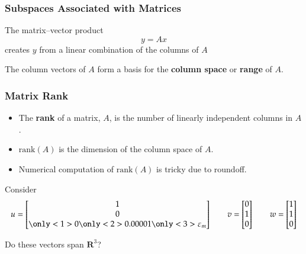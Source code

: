 \documentclass[10pt]{beamer}
\newcommand{\rank}[1]{\ensuremath{\mathrm{rank}(#1)}}
\newcommand{\epsm}{\ensuremath{\varepsilon_m}}
\begin{document}
\begin{frame}
\frametitle{Subspaces Associated with Matrices}

The matrix--vector product
\begin{equation*}
    y = Ax
\end{equation*}
creates $y$ from a linear combination of the columns of $A$

The column vectors of $A$ form a basis for the \textbf{column space}
or \textbf{range} of $A$.

\end{frame}
\begin{frame}
\frametitle{Matrix Rank}

\begin{itemize}
  \item The \textbf{rank} of a matrix, $A$, is the number of linearly independent
columns in $A$.

  \item \rank{A} is the dimension of the column space of $A$.

  \item Numerical computation of \rank{A} is tricky due to roundoff.
\end{itemize}

Consider
\begin{equation*}
    u = \begin{bmatrix} 1 \\ 0 \\ 
    \only<1>{0}
    \only<2>{0.00001}
    \only<3>{\epsm}
    \end{bmatrix}
    \ \ \ \ \ \ \ \
    v = \begin{bmatrix} 0 \\ 1 \\ 0   \end{bmatrix}
    \ \ \ \ \ \ \ \
    w = \begin{bmatrix} 1 \\ 1 \\ 0 \end{bmatrix}
\end{equation*}

\vspace{1ex}
Do these vectors span $\mathbf{R}^3$?
\end{frame}
\end{document}
